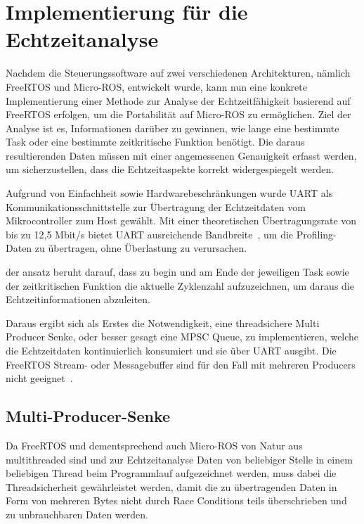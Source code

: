 \section{Implementierung für die Echtzeitanalyse}

Nachdem die Steuerungssoftware auf zwei verschiedenen Architekturen, nämlich
FreeRTOS und Micro-ROS, entwickelt wurde, kann nun eine konkrete
Implementierung einer Methode zur Analyse der Echtzeitfähigkeit basierend auf
FreeRTOS erfolgen, um die Portabilität auf Micro-ROS zu ermöglichen. Ziel der
Analyse ist es, Informationen darüber zu gewinnen, wie lange eine bestimmte Task
oder eine bestimmte zeitkritische Funktion benötigt. Die daraus resultierenden
Daten müssen mit einer angemessenen Genauigkeit erfasst werden, um
sicherzustellen, dass die Echtzeitaspekte korrekt widergespiegelt werden.

Aufgrund von Einfachheit sowie Hardwarebeschränkungen wurde UART als
Kommunikationsschnittstelle zur Übertragung der Echtzeitdaten vom
Mikrocontroller zum Host gewählt. Mit einer theoretischen Übertragungsrate von
bis zu 12,5 Mbit/s bietet UART ausreichende Bandbreite~\cite[S.
2]{stm32_datasheet}, um die Profiling-Daten zu übertragen, ohne Überlastung zu
verursachen.

der ansatz beruht darauf, dass zu begin und am Ende der jeweiligen Task
sowie der zeitkritischen Funktion die aktuelle Zyklenzahl aufzuzeichnen, um
daraus die Echtzeitinformationen abzuleiten.

Daraus ergibt sich als Erstes die Notwendigkeit, eine threadsichere Multi
Producer Senke, oder besser gesagt eine \ac{MPSC} Queue, zu implementieren,
welche die Echtzeitdaten kontinuierlich konsumiert und sie über UART ausgibt.
Die FreeRTOS Stream- oder Messagebuffer sind für den Fall mit mehreren Producers
nicht geeignet~\cite{FreeRTOSStreamBuffer}.

\subsection{Multi-Producer-Senke}

Da FreeRTOS und dementsprechend auch Micro-ROS von Natur aus multithreaded sind
und zur Echtzeitanalyse Daten von beliebiger Stelle in einem beliebigen Thread
beim Programmlauf aufgezeichnet werden, muss dabei die Threadsicherheit
gewährleistet werden, damit die zu übertragenden Daten in Form von mehreren
Bytes nicht durch Race Conditions teils überschrieben und zu unbrauchbaren Daten
werden.


